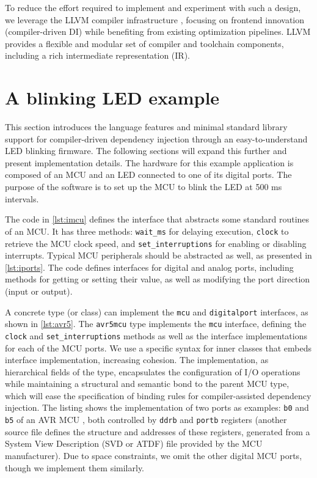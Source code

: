 \documentclass[sigconf]{acmart}
\begin{document}
To reduce the effort required to implement and experiment with such a design, we leverage the LLVM compiler infrastructure \cite{lattner2004llvm}, focusing on frontend innovation (compiler-driven DI) while benefiting from existing optimization pipelines. LLVM provides a flexible and modular set of compiler and toolchain components, including a rich intermediate representation (IR).


\section{A blinking LED example} \label{sec:ledblink}
 
This section introduces the language features and minimal standard library support for compiler-driven dependency injection through an easy-to-understand LED blinking firmware. The following sections will expand this further and present implementation details. The hardware for this example application is composed of an MCU and an LED connected to one of its digital ports. The purpose of the software is to set up the MCU to blink the LED at 500 ms intervals.

The code in \autoref{lst:imcu} defines the interface that abstracts some standard routines of an MCU. It has three methods: {\tt wait\_ms} for delaying execution, {\tt clock} to retrieve the MCU clock speed, and {\tt set\_interruptions} for enabling or disabling interrupts. Typical MCU peripherals should be abstracted as well, as presented in \autoref{lst:iports}. The code defines interfaces for digital and analog ports, including methods for getting or setting their value, as well as modifying the port direction (input or output).



A concrete type (or class) can implement the {\tt mcu} and {\tt digitalport} interfaces, as shown in \autoref{lst:avr5}. The {\tt avr5mcu} type implements the {\tt mcu} interface, defining the {\tt clock} and {\tt set\_interruptions} methods as well as the interface implementations for each of the MCU ports. We use a specific syntax for inner classes that embeds interface implementation, increasing cohesion. The implementation, as hierarchical fields of the type, encapsulates the configuration of I/O operations while maintaining a structural and semantic bond to the parent MCU type, which will ease the specification of binding rules for compiler-assisted dependency injection. The listing shows the implementation of two ports as examples: {\tt b0} and {\tt b5} of an AVR MCU \cite{atmel328p}, both controlled by {\tt ddrb} and {\tt portb} registers (another source file defines the structure and addresses of these registers, generated from a System View Description (SVD or ATDF) file provided by the MCU manufacturer). Due to space constraints, we omit the other digital MCU ports, though we implement them similarly. 
\end{document}
